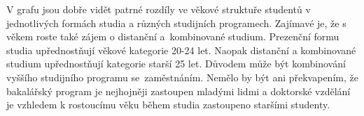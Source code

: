 \documentclass[12pt]{report}			%
\begin{document}
                V grafu jsou dobře vidět patrné rozdíly ve věkové struktuře studentů v jednotlivých formách studia a různých studijních programech. Zajímavé je, že s věkem roste také zájem o distanční a~kombinované  studium. Prezenční formu studia upřednostňují věkové kategorie 20-24 let. Naopak distanční a kombinované studium upřednostňují kategorie starší 25 let. Důvodem může být kombinování vyššího studijního programu se~zaměstnáním. Nemělo by být ani překvapením, že bakalářský program je nejhojněji zastoupen mladými lidmi a doktorské vzdělání je vzhledem k rostoucímu věku během studia zastoupeno staršími studenty.~\cite{LidskeZdrojeVIT}
            
            
            
            
            
            
\end{document}
